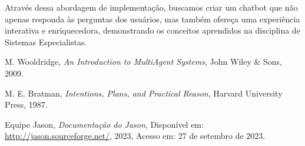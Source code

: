 \documentclass[12pt]{article}
\begin{document}
    Através dessa abordagem de implementação, buscamos criar um chatbot que não apenas responda às perguntas dos usuários, mas também ofereça uma experiência interativa e enriquecedora, demonstrando os conceitos aprendidos na disciplina de Sistemas Especialistas.

    
    
\begin{thebibliography}{9}
M. Wooldridge,
\textit{An Introduction to MultiAgent Systems},
John Wiley \& Sons, 2009.

M. E. Bratman,
\textit{Intentions, Plans, and Practical Reason},
Harvard University Press, 1987.

Equipe Jason,
\textit{Documentação do Jason},
Disponível em: \url{http://jason.sourceforge.net/}, 2023, Acesso em: 27 de setembro de 2023.

\end{thebibliography}
\end{document}
